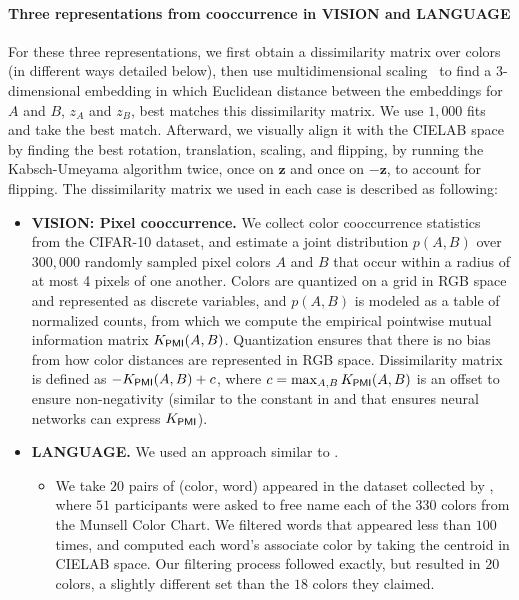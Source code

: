 \paragraph{Three representations from cooccurrence in VISION and LANGUAGE}
For these three representations, we first obtain a dissimilarity matrix over colors (in different ways detailed below), then use multidimensional scaling~\citep{shepard1980multidimensional} to find a 3-dimensional embedding in which Euclidean distance between the embeddings for $A$ and $B$, ${z}_A$ and ${z}_B$, best matches this dissimilarity matrix. We use $1{,}000$ fits and take the best match. Afterward, we visually align it with the CIELAB space by finding the best rotation, translation, scaling, and flipping, by running the Kabsch-Umeyama algorithm \citep{kabsch1976solution,kabsch1978discussion,umeyama1991least} twice, once on $\mathbf{z}$ and once on $-\mathbf{z}$, to account for flipping. The dissimilarity matrix we used in each case is described as following:\begin{itemize}
    \item \textbf{VISION: Pixel cooccurrence.} 
    We collect color cooccurrence statistics from the CIFAR-10 dataset, and estimate a joint distribution $p(A,B)$ over $300{,}000$ randomly sampled pixel colors $A$ and $B$ that occur within a radius of at most 4 pixels of one another. Colors are quantized on a grid in RGB space and represented as discrete variables, and $p(A,B)$ is modeled as a table of normalized counts, from which we compute the empirical pointwise mutual information matrix $K_\mathsf{PMI}(A, B)$. Quantization ensures that there is no bias from how color distances are represented in RGB space. Dissimilarity matrix is defined as $-K_\mathsf{PMI}(A, B) + c$, where $c = \max_{A, B} K_\mathsf{PMI}(A, B)$ is an offset to ensure non-negativity (similar to the constant in  and  that ensures neural networks can express $K_\mathsf{PMI}$).
    \item \textbf{LANGUAGE.} We used an approach similar to \citet{abdou2021can}.  \begin{itemize}
        \item We take $20$ pairs of (color, word) appeared in the dataset collected by \citet{lindsey2014color}, where $51$ participants were asked to free name each of the $330$ colors from the Munsell Color Chart. We filtered words that appeared less than $100$ times, and computed each word's associate color by taking the centroid in CIELAB space. Our filtering process followed \citet{abdou2021can} exactly, but resulted in $20$ colors, a slightly different set than the $18$ colors they claimed. 

\end{itemize}
\end{itemize}
